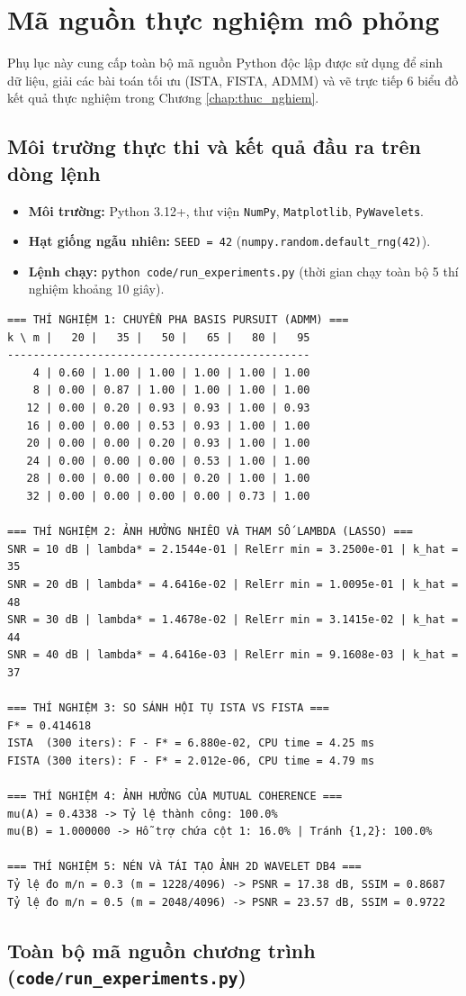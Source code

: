 \chapter{Mã nguồn thực nghiệm mô phỏng}
\label{app:source_code}

Phụ lục này cung cấp toàn bộ mã nguồn Python độc lập được sử dụng để sinh dữ liệu, giải các bài toán tối ưu (ISTA, FISTA, ADMM) và vẽ trực tiếp 6 biểu đồ kết quả thực nghiệm trong Chương \ref{chap:thuc_nghiem}.

\section{Môi trường thực thi và kết quả đầu ra trên dòng lệnh}
\begin{itemize}
    \item \textbf{Môi trường:} Python 3.12+, thư viện \texttt{NumPy}, \texttt{Matplotlib}, \texttt{PyWavelets}.
    \item \textbf{Hạt giống ngẫu nhiên:} \texttt{SEED = 42} (\texttt{numpy.random.default\_rng(42)}).
    \item \textbf{Lệnh chạy:} \texttt{python code/run\_experiments.py} (thời gian chạy toàn bộ 5 thí nghiệm khoảng $10$ giây).
\end{itemize}

{\scriptsize
\begin{verbatim}
=== THÍ NGHIỆM 1: CHUYỂN PHA BASIS PURSUIT (ADMM) ===
k \ m |   20 |   35 |   50 |   65 |   80 |   95
-----------------------------------------------
    4 | 0.60 | 1.00 | 1.00 | 1.00 | 1.00 | 1.00
    8 | 0.00 | 0.87 | 1.00 | 1.00 | 1.00 | 1.00
   12 | 0.00 | 0.20 | 0.93 | 0.93 | 1.00 | 0.93
   16 | 0.00 | 0.00 | 0.53 | 0.93 | 1.00 | 1.00
   20 | 0.00 | 0.00 | 0.20 | 0.93 | 1.00 | 1.00
   24 | 0.00 | 0.00 | 0.00 | 0.53 | 1.00 | 1.00
   28 | 0.00 | 0.00 | 0.00 | 0.20 | 1.00 | 1.00
   32 | 0.00 | 0.00 | 0.00 | 0.00 | 0.73 | 1.00

=== THÍ NGHIỆM 2: ẢNH HƯỞNG NHIỄU VÀ THAM SỐ LAMBDA (LASSO) ===
SNR = 10 dB | lambda* = 2.1544e-01 | RelErr min = 3.2500e-01 | k_hat = 35
SNR = 20 dB | lambda* = 4.6416e-02 | RelErr min = 1.0095e-01 | k_hat = 48
SNR = 30 dB | lambda* = 1.4678e-02 | RelErr min = 3.1415e-02 | k_hat = 44
SNR = 40 dB | lambda* = 4.6416e-03 | RelErr min = 9.1608e-03 | k_hat = 37

=== THÍ NGHIỆM 3: SO SÁNH HỘI TỤ ISTA VS FISTA ===
F* = 0.414618
ISTA  (300 iters): F - F* = 6.880e-02, CPU time = 4.25 ms
FISTA (300 iters): F - F* = 2.012e-06, CPU time = 4.79 ms

=== THÍ NGHIỆM 4: ẢNH HƯỞNG CỦA MUTUAL COHERENCE ===
mu(A) = 0.4338 -> Tỷ lệ thành công: 100.0%
mu(B) = 1.000000 -> Hỗ trợ chứa cột 1: 16.0% | Tránh {1,2}: 100.0%

=== THÍ NGHIỆM 5: NÉN VÀ TÁI TẠO ẢNH 2D WAVELET DB4 ===
Tỷ lệ đo m/n = 0.3 (m = 1228/4096) -> PSNR = 17.38 dB, SSIM = 0.8687
Tỷ lệ đo m/n = 0.5 (m = 2048/4096) -> PSNR = 23.57 dB, SSIM = 0.9722
\end{verbatim}
}

\section{Toàn bộ mã nguồn chương trình (\texttt{code/run\_experiments.py})}

